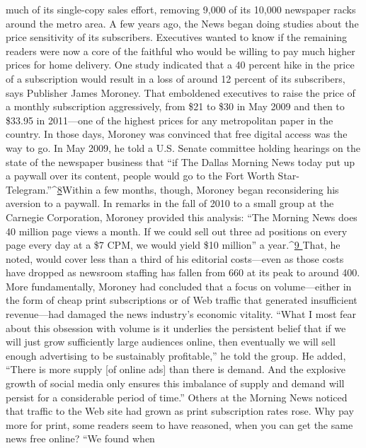 much of its single-copy sales effort, removing 9,000 of its 10,000 newspaper
racks around the metro area.
A few years ago, the News began doing studies about the price sensitivity of
its subscribers. Executives wanted to know if the remaining readers were now a
core of the faithful who would be willing to pay much higher prices for home
delivery. One study indicated that a 40 percent hike in the price of a subscription
would result in a loss of around 12 percent of its subscribers, says Publisher James
Moroney. That emboldened executives to raise the price of a monthly subscription
aggressively, from \$21 to \$30 in May 2009 and then to \$33.95 in 2011—one
of the highest prices for any metropolitan paper in the country.
In those days, Moroney was convinced that free digital access was the way
to go. In May 2009, he told a U.S. Senate committee holding hearings on the
state of the newspaper business that ``if The Dallas Morning News today put up
a paywall over its content, people would go to the Fort Worth Star-Telegram.''^{\href{#endnotes-ch5}{8}}Within a few months, though, Moroney began reconsidering his aversion to a
paywall. In remarks in the fall of 2010 to a small group at the Carnegie Corporation,
Moroney provided this analysis: ``The Morning News does 40 million page
views a month. If we could sell out three ad positions on every page every day at
a \$7 CPM, we would yield \$10 million'' a year.^{\href{#endnotes-ch5}{9 }}That, he noted, would cover less
than a third of his editorial costs—even as those costs have dropped as newsroom
staffing has fallen from 660 at its peak to around 400.
More fundamentally, Moroney had concluded that a focus on volume—either
in the form of cheap print subscriptions or of Web traffic that generated insufficient
revenue—had damaged the news industry’s economic vitality. ``What I
most fear about this obsession with volume is it underlies the persistent belief
that if we will just grow sufficiently large audiences online, then eventually we
will sell enough advertising to be sustainably profitable,'' he told the group. He
added, ``There is more supply [of online ads] than there is demand. And the explosive
growth of social media only ensures this imbalance of supply and demand
will persist for a considerable period of time.''
Others at the Morning News noticed that traffic to the Web site had grown
as print subscription rates rose. Why pay more for print, some readers seem to
have reasoned, when you can get the same news free online? ``We found when
